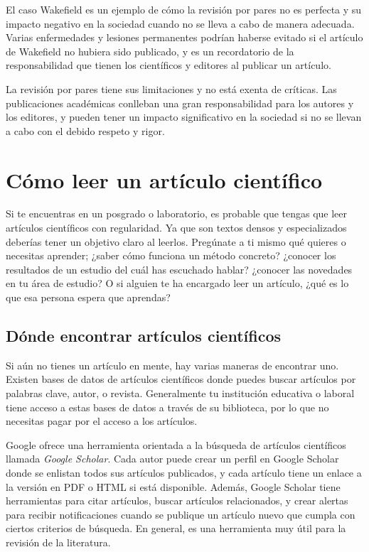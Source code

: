 El caso Wakefield es un ejemplo de cómo la revisión por pares no es perfecta y
su impacto negativo en la sociedad cuando no se lleva a cabo de manera
adecuada.
Varias enfermedades y lesiones permanentes podrían haberse evitado si el
artículo de Wakefield no hubiera sido publicado, y es un recordatorio de la
responsabilidad que tienen los científicos y editores al publicar un artículo.

\begin{remember}
    La revisión por pares tiene sus limitaciones y no está exenta de críticas.
    Las publicaciones académicas conlleban una gran responsabilidad para los
    autores y los editores, y pueden tener un impacto significativo en la
    sociedad si no se llevan a cabo con el debido respeto y rigor.
\end{remember}

\section{Cómo leer un artículo científico}
\label{sec:comoleer}

Si te encuentras en un posgrado o laboratorio, es probable que tengas que leer
artículos científicos con regularidad.
Ya que son textos densos y especializados deberías tener un objetivo claro al
leerlos.
Pregúnate a ti mismo qué quieres o necesitas aprender; ¿saber cómo funciona un
método concreto? ¿conocer los resultados de un estudio del cuál has escuchado
hablar? ¿conocer las novedades en tu área de estudio? O si alguien te ha
encargado leer un artículo, ¿qué es lo que esa persona espera que aprendas?

\subsection*{Dónde encontrar artículos científicos}
Si aún no tienes un artículo en mente, hay varias maneras de encontrar uno.
Existen bases de datos de artículos científicos donde puedes buscar artículos
por palabras clave, autor, o revista.
Generalmente tu institución educativa o laboral tiene acceso a estas bases de
datos a través de su biblioteca, por lo que no necesitas pagar por el acceso a
los artículos.

Google ofrece una herramienta orientada a la búsqueda de artículos científicos
llamada \emph{Google Scholar}.
Cada autor puede crear un perfil en Google Scholar donde se enlistan todos sus
artículos publicados, y cada artículo tiene un enlace a la versión en PDF o HTML
si está disponible.
Además, Google Scholar tiene herramientas para citar artículos, buscar artículos
relacionados, y crear alertas para recibir notificaciones cuando se publique un
artículo nuevo que cumpla con ciertos criterios de búsqueda.
En general, es una herramienta muy útil para la revisión de la literatura.

